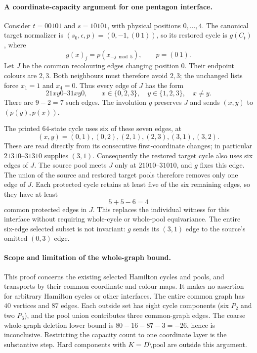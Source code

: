 \paragraph{A coordinate-capacity argument for one pentagon interface.}
Consider $t=00101$ and $s=10101$, with physical positions $0,\ldots,4$.
The canonical target normalizer is $(s_0,\epsilon,p)=(0,-1,(0\ 1))$,
so its restored cycle is $g(C_t)$, where
\[
 g(x)_j=p(x_{-j\bmod5}),\qquad p=(0\ 1).
\]
Let $J$ be the common recolouring edges changing position $0$.
Their endpoint colours are $2,3$. Both neighbours must therefore
avoid $2,3$; the unchanged lists force $x_1=1$ and $x_4=0$.
Thus every edge of $J$ has the form
\[
 21xy0\text{--}31xy0,\qquad
 x\in\{0,2,3\},\quad y\in\{1,2,3\},\quad x\ne y.
\]
There are $9-2=7$ such edges. The involution $g$ preserves $J$ and
sends $(x,y)$ to $(p(y),p(x))$.

The printed $64$-state cycle uses six of these seven edges, at
\[
(x,y)=(0,1),(0,2),(2,1),(2,3),(3,1),(3,2).
\]
These are read directly from its consecutive first-coordinate changes;
in particular $21310$--$31310$ supplies $(3,1)$.
Consequently the restored target cycle also uses six edges of $J$.
The source pool meets $J$ only at $21010$--$31010$, and $g$ fixes
this edge. The union of the source and restored target pools therefore
removes only one edge of $J$. Each protected cycle retains at least
five of the six remaining edges, so they have at least
\[
 5+5-6=4
\]
common protected edges in $J$. This replaces the individual witness
for this interface without requiring whole-cycle or whole-pool
equivariance. The entire six-edge selected subset is not invariant:
$g$ sends its $(3,1)$ edge to the source's omitted $(0,3)$ edge.

\paragraph{Scope and limitation of the whole-graph bound.}
This proof concerns the existing selected Hamilton cycles and pools,
and transports by their common coordinate and colour maps. It makes
no assertion for arbitrary Hamilton cycles or other interfaces.
The entire common graph has $40$ vertices and $87$ edges.
Each outside set has eight cycle components (six $P_2$ and two $P_6$),
and the pool union contributes three common-graph edges. The coarse
whole-graph deletion lower bound is $80-16-87-3=-26$, hence is
inconclusive. Restricting the capacity count to one coordinate layer
is the substantive step. Hard components with $K=D\setminus\text{pool}$
are outside this argument.

